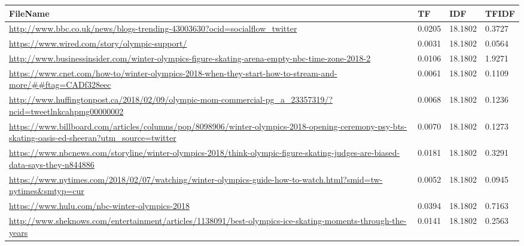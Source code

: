 \documentclass[11pt]{report}
\begin{document}
\begin{center}
\begin{tabularx}{\textwidth}{X|l|l|l}
 \hline
FileName & TF & IDF & TFIDF\\\hline 
\url{http://www.bbc.co.uk/news/blogs-trending-43003630?ocid=socialflow_twitter} & 0.0205 & 18.1802 & 0.3727\\\hline 
\url{https://www.wired.com/story/olympic-support/} & 0.0031 & 18.1802 & 0.0564\\\hline 
\url{http://www.businessinsider.com/winter-olympics-figure-skating-arena-empty-nbc-time-zone-2018-2} & 0.0106 & 18.1802 & 1.9271\\\hline 
\url{https://www.cnet.com/how-to/winter-olympics-2018-when-they-start-how-to-stream-and-more/##ftag=CADf328eec} & 0.0061 & 18.1802 & 0.1109\\\hline 
\url{http://www.huffingtonpost.ca/2018/02/09/olympic-mom-commercial-pg_a_23357319/?ncid=tweetlnkcahpmg00000002} & 0.0068 & 18.1802 & 0.1236\\ \hline 
\url{https://www.billboard.com/articles/columns/pop/8098906/winter-olympics-2018-opening-ceremony-psy-bts-skating-oasis-ed-sheeran?utm_source=twitter} & 0.0070 & 18.1802 & 0.1273\\ \hline 
\url{https://www.nbcnews.com/storyline/winter-olympics-2018/think-olympic-figure-skating-judges-are-biased-data-says-they-n844886} & 0.0181 & 18.1802 & 0.3291\\\hline 
\url{https://www.nytimes.com/2018/02/07/watching/winter-olympics-guide-how-to-watch.html?smid=tw-nytimes&smtyp=cur} & 0.0052 & 18.1802 & 0.0945\\ \hline 
\url{https://www.hulu.com/nbc-winter-olympics-2018} & 0.0394 & 18.1802 & 0.7163\\\hline 
\url{http://www.sheknows.com/entertainment/articles/1138091/best-olympics-ice-skating-moments-through-the-years} & 0.0141 & 18.1802 & 0.2563\\\hline 
\end{tabularx}
\end{center}


\pagebreak
\pagebreak
\end{document}
